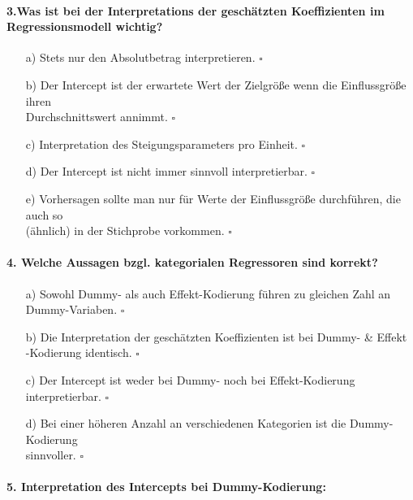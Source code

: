 \documentclass[a4paper]{article}
\begin{document}
\paragraph{3.Was ist bei der Interpretations der geschätzten Koeffizienten im Regressionsmodell wichtig?}

\begin{itemize}
    \item[a)] Stets nur den Absolutbetrag interpretieren. \hfill $\square$
    \item[b)] Der Intercept ist der erwartete Wert der Zielgröße wenn die Einflussgröße ihren\\Durchschnittswert annimmt. \hfill $\square$
    \item[c)] Interpretation des Steigungsparameters pro Einheit. \hfill $\square$
    \item[d)] Der Intercept ist nicht immer sinnvoll interpretierbar. \hfill $\square$
    \item[e)] Vorhersagen sollte man nur für Werte der Einflussgröße durchführen, die auch so\\(ähnlich) in der Stichprobe vorkommen. \hfill $\square$
\end{itemize}

\paragraph{4. Welche Aussagen bzgl. kategorialen Regressoren sind korrekt?}

\begin{itemize}
    \item[a)] Sowohl Dummy- als auch Effekt-Kodierung führen zu gleichen Zahl an Dummy-Variaben. \hfill $\square$
    \item[b)] Die Interpretation der geschätzten Koeffizienten ist bei Dummy- \& Effekt\\-Kodierung identisch. \hfill $\square$
    \item[c)] Der Intercept ist weder bei Dummy- noch bei Effekt-Kodierung interpretierbar. \hfill $\square$
    \item[d)] Bei einer höheren Anzahl an verschiedenen Kategorien ist die Dummy-Kodierung\\sinnvoller. \hfill $\square$
\end{itemize}

\paragraph{5. Interpretation des Intercepts bei Dummy-Kodierung:}
\end{document}
